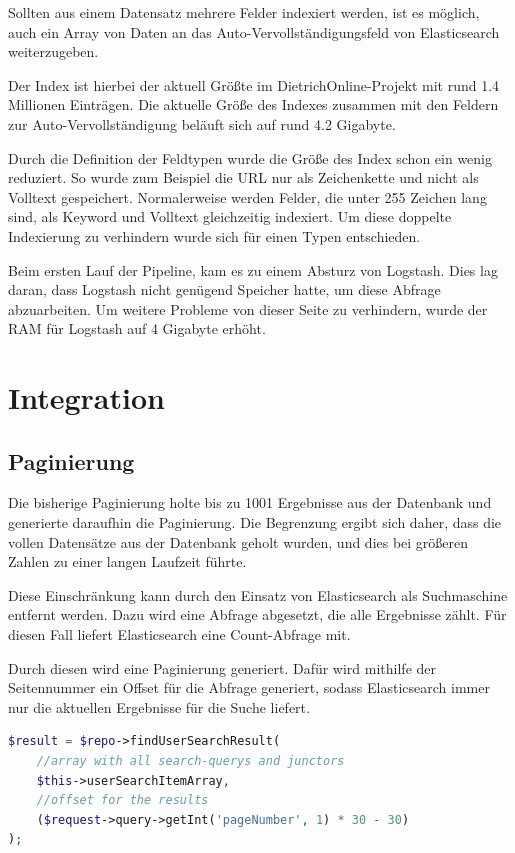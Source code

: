Sollten aus einem Datensatz mehrere Felder indexiert werden, ist es möglich, auch ein Array von Daten an das Auto-Vervollständigungsfeld von Elasticsearch weiterzugeben.

Der Index ist hierbei der aktuell Größte im DietrichOnline-Projekt mit rund 1.4 Millionen Einträgen. Die aktuelle Größe des Indexes zusammen mit den Feldern zur Auto-Vervollständigung beläuft sich auf rund 4.2 Gigabyte. 

Durch die Definition der Feldtypen wurde die Größe des Index schon ein wenig reduziert. So wurde zum Beispiel die URL nur als Zeichenkette und nicht als Volltext gespeichert. Normalerweise werden Felder, die unter 255 Zeichen lang sind, als Keyword und Volltext gleichzeitig indexiert. Um diese doppelte Indexierung zu verhindern wurde sich für einen Typen entschieden.

Beim ersten Lauf der Pipeline, kam es zu einem Absturz von Logstash. Dies lag daran, dass Logstash nicht genügend Speicher hatte, um diese Abfrage abzuarbeiten. Um weitere Probleme von dieser Seite zu verhindern, wurde der RAM für Logstash auf 4 Gigabyte erhöht. \cite{ElasticsearchB.V..13.2.2020}

\section{Integration}

\subsection{Paginierung}

Die bisherige Paginierung holte bis zu 1001 Ergebnisse aus der Datenbank und generierte daraufhin die Paginierung. Die Begrenzung ergibt sich daher, dass die vollen Datensätze aus der Datenbank geholt wurden, und dies bei größeren Zahlen zu einer langen Laufzeit führte.

Diese Einschränkung kann durch den Einsatz von Elasticsearch als Suchmaschine entfernt werden. Dazu wird eine Abfrage abgesetzt, die alle Ergebnisse zählt. Für diesen Fall liefert Elasticsearch eine Count-Abfrage mit.

Durch diesen wird eine Paginierung generiert. Dafür wird mithilfe der Seitennummer ein Offset für die Abfrage generiert, sodass Elasticsearch immer nur die aktuellen Ergebnisse für die Suche liefert.

\begin{lstlisting}[language=PHP, frame=single, label={lst:generierung},  caption=Generierung des Offsets für die Paginierung,captionpos=b] 
$result = $repo->findUserSearchResult(
    //array with all search-querys and junctors
    $this->userSearchItemArray, 
    //offset for the results
    ($request->query->getInt('pageNumber', 1) * 30 - 30)
);
\end{lstlisting}

